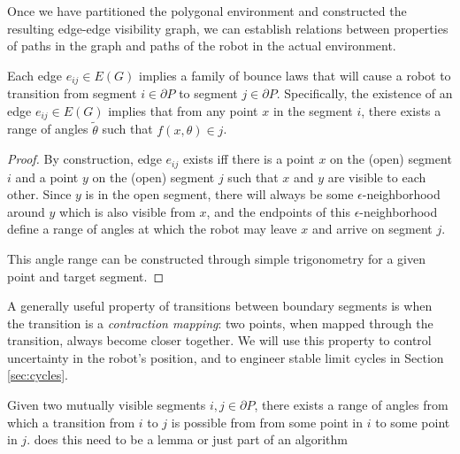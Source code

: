 \documentclass[]{styles/svproc}  %
\begin{document}
Once we have partitioned the polygonal environment and constructed the resulting
edge-edge visibility graph, we can establish relations between properties of
paths in the graph and paths of the robot in the actual environment.

\begin{lemma}\label{lemma:transition}
Each edge $e_{ij} \in E(G)$ implies a family of bounce laws that will cause a
robot to transition from segment $i \in \partial P$ to segment $j \in \partial
P$. Specifically, the existence of an edge $e_{ij} \in E(G)$ implies that from any
point $x$ in the segment $i$, there exists a range of angles $\tilde{\theta}$
such that $f(x,\theta) \in j$.
\end{lemma}

\begin{proof}
By construction, edge $e_{ij}$ exists iff there is a point $x$ on the (open)
segment $i$ and a point $y$ on the (open) segment $j$ such that $x$ and $y$ are
visible to each other. Since $y$ is in the open segment, there will always be some $\epsilon$-neighborhood around
$y$ which is also visible from $x$, and the endpoints of this
$\epsilon$-neighborhood define a range of angles at which the robot may leave
$x$ and arrive on segment $j$.

This angle range can be constructed through simple trigonometry for a
given point and target segment.
\end{proof}

A generally useful property of transitions between boundary segments is when the
transition is a \emph{contraction mapping}: two points, when mapped through the
transition, always become closer together. We will use this property to control
uncertainty in the robot's position, and to engineer stable limit cycles in
Section \ref{sec:cycles}.

\begin{lemma} \label{lemma:angrange}
Given two mutually visible segments $i,j \in \partial P$, there exists a range 
of angles from which a transition from $i$ to $j$ is possible from from some
point in $i$ to some point in $j$.
{\color{red} does this need to be a lemma or just part of an algorithm}
\end{lemma}
\end{document}
